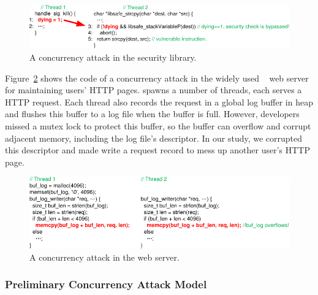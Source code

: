 \begin{figure}[h]
\vspace{-.1in}
\centering
\includegraphics[width=0.8\columnwidth]{figures/libsafe}
\vspace{-.1in}
\caption{{A concurrency attack in the \libsafe security library.}} 
\label{fig:libsafe}
\vspace{-.15in}
\end{figure}

Figure~\ref{fig:apache} shows the code of a concurrency attack in 
the widely used \apache~\cite{apache} web server for maintaining users' HTTP 
pages. \apache spawns a number of threads, each serves a HTTP request. Each 
thread also records the request in a global log buffer in heap and flushes this 
buffer to a log file when the buffer is full. However, developers missed a 
mutex lock to protect this buffer, so the buffer can overflow and corrupt 
adjacent memory, including the log file's descriptor. In our study, we 
corrupted this descriptor and made \apache write a request record to mess up 
another user's HTTP page.

\begin{figure}[h]
\vspace{-.05in}
\centering
\includegraphics[width=0.8\columnwidth]{figures/apache}
\vspace{-.1in}
\caption{{A concurrency attack in the \apache web server.}} \label{fig:apache}
\vspace{-.15in}
\end{figure}



\vspace{-.15in}\subsubsection{Preliminary Concurrency Attack Model} 
\label{sec:attack-phase}\vspace{-.075in}

